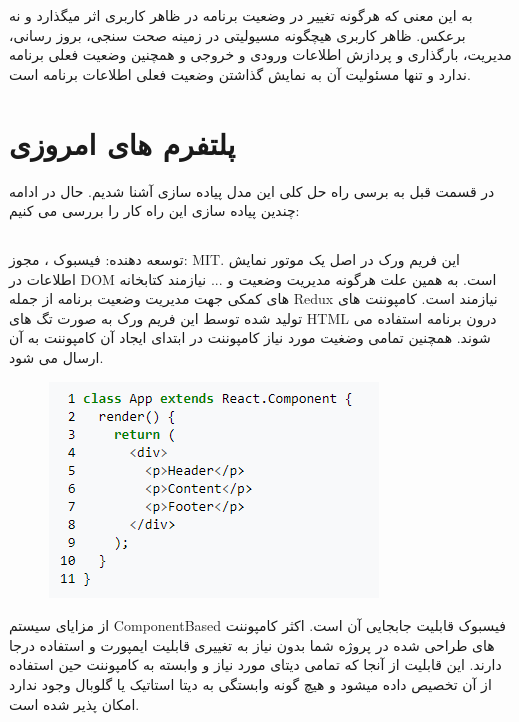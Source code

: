 \documentclass{CSICC2020}
\begin{document}
به این معنی که هرگونه تغییر در وضعیت برنامه در ظاهر کاربری اثر میگذارد و نه برعکس.
ظاهر کاربری هیچگونه مسیولیتی در زمینه صحت سنجی، بروز رسانی، مدیریت، بارگذاری و پردازش اطلاعات ورودی و خروجی و همچنین وضعیت فعلی برنامه ندارد و تنها مسئولیت آن به نمایش گذاشتن وضعیت فعلی اطلاعات برنامه است.

\section{پلتفرم های امروزی}
در قسمت قبل به برسی راه حل کلی این مدل پیاده سازی آشنا شدیم. حال در ادامه چندین پیاده سازی این راه کار را بررسی می کنیم:

\subsection{}
توسعه دهنده: فیسبوک ، مجوز: MIT. این فریم ورک در اصل یک موتور نمایش اطلاعات در DOM است. به همین علت هرگونه مدیریت وضعیت و ... نیازمند کتابخانه های کمکی جهت مدیریت وضعیت برنامه از جمله Redux نیازمند است.
کامپوننت های تولید شده توسط این فریم ورک به صورت تگ های HTML درون برنامه استفاده می شوند. همچنین تمامی وضغیت مورد نیاز کامپوننت در ابتدای ایجاد آن کامپوننت به آن ارسال می شود.

\begin{figure}[h!]
\centering\includegraphics[width=\linewidth]{Images/react}
\caption{}
\label{fig:React}
\end{figure}

از مزایای سیستم ComponentBased فیسبوک قابلیت جابجایی آن است. اکثر کامپوننت های طراحی شده در پروژه شما بدون نیاز به تغییری قابلیت ایمپورت و استفاده درجا دارند.
این قابلیت از آنجا که تمامی دیتای مورد نیاز و وابسته به کامپوننت حین استفاده از آن تخصیص داده میشود و هیچ گونه وابستگی به دیتا استاتیک یا گلوبال وجود ندارد امکان پذیر شده است. \cite{react}
\end{document}
